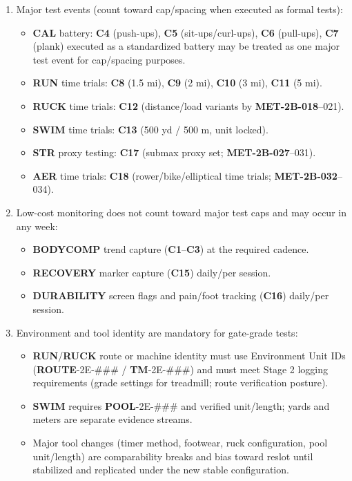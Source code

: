 \documentclass[10pt]{article}
\begin{document}
\begin{enumerate}
\item Major test events (count toward cap/spacing when executed as formal tests):
\begin{itemize}
\item \textbf{CAL} battery: \textbf{C4} (push-ups), \textbf{C5} (sit-ups/curl-ups), \textbf{C6} (pull-ups), \textbf{C7} (plank) executed as a standardized battery may be treated as one major test event for cap/spacing purposes.
\item \textbf{RUN} time trials: \textbf{C8} (1.5 mi), \textbf{C9} (2 mi), \textbf{C10} (3 mi), \textbf{C11} (5 mi).
\item \textbf{RUCK} time trials: \textbf{C12} (distance/load variants by \textbf{MET-2B-018}–021).
\item \textbf{SWIM} time trials: \textbf{C13} (500 yd / 500 m, unit locked).
\item \textbf{STR} proxy testing: \textbf{C17} (submax proxy set; \textbf{MET-2B-027}–031).
\item \textbf{AER} time trials: \textbf{C18} (rower/bike/elliptical time trials; \textbf{MET-2B-032}–034).
\end{itemize}

\item Low-cost monitoring does not count toward major test caps and may occur in any week:
\begin{itemize}
\item \textbf{BODYCOMP} trend capture (\textbf{C1}–\textbf{C3}) at the required cadence.
\item \textbf{RECOVERY} marker capture (\textbf{C15}) daily/per session.
\item \textbf{DURABILITY} screen flags and pain/foot tracking (\textbf{C16}) daily/per session.
\end{itemize}

\item Environment and tool identity are mandatory for gate-grade tests:
\begin{itemize}
\item \textbf{RUN}/\textbf{RUCK} route or machine identity must use Environment Unit IDs (\textbf{ROUTE}-2E-\#\#\# / \textbf{TM}-2E-\#\#\#) and must meet Stage 2 logging requirements (grade settings for treadmill; route verification posture).
\item \textbf{SWIM} requires \textbf{POOL}-2E-\#\#\# and verified unit/length; yards and meters are separate evidence streams.
\item Major tool changes (timer method, footwear, ruck configuration, pool unit/length) are comparability breaks and bias toward reslot until stabilized and replicated under the new stable configuration.
\end{itemize}


\end{enumerate}
\end{document}
